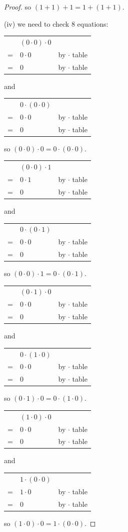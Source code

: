 \documentclass[14pt]{extarticle}
\newcommand{\cy}{\color{cyan}}
\begin{document}
\begin{proof}
so \((1 + 1) + 1 = 1 + (1 + 1)\).

(iv) we need to check 8 equations:

\begin{tabular}{cll}
  & \((0 \cdot 0) \cdot 0\) & \\
= & \(0 \cdot 0\) & {\cy by $\cdot$ table} \\
= & \(0\) & {\cy by $\cdot$ table}
\end{tabular}
and
\begin{tabular}{cll}
  & \(0 \cdot (0 \cdot 0)\) & \\
= & \(0 \cdot 0\) & {\cy by $\cdot$ table} \\
= & \(0\) & {\cy by $\cdot$ table}
\end{tabular}
so \((0 \cdot 0) \cdot 0 = 0 \cdot (0 \cdot 0)\).

\begin{tabular}{cll}
  & \((0 \cdot 0) \cdot 1\) & \\
= & \(0 \cdot 1\) & {\cy by $\cdot$ table} \\
= & \(0\) & {\cy by $\cdot$ table}
\end{tabular}
and
\begin{tabular}{cll}
  & \(0 \cdot (0 \cdot 1)\) & \\
= & \(0 \cdot 0\) & {\cy by $\cdot$ table} \\
= & \(0\) & {\cy by $\cdot$ table}
\end{tabular}
so \((0 \cdot 0) \cdot 1 = 0 \cdot (0 \cdot 1)\).

\begin{tabular}{cll}
  & \((0 \cdot 1) \cdot 0\) & \\
= & \(0 \cdot 0\) & {\cy by $\cdot$ table} \\
= & \(0\) & {\cy by $\cdot$ table}
\end{tabular}
and
\begin{tabular}{cll}
  & \(0 \cdot (1 \cdot 0)\) & \\
= & \(0 \cdot 0\) & {\cy by $\cdot$ table} \\
= & \(0\) & {\cy by $\cdot$ table}
\end{tabular}
so \((0 \cdot 1) \cdot 0 = 0 \cdot (1 \cdot 0)\).

\begin{tabular}{cll}
  & \((1 \cdot 0) \cdot 0\) & \\
= & \(0 \cdot 0\) & {\cy by $\cdot$ table} \\
= & \(0\) & {\cy by $\cdot$ table}
\end{tabular}
and
\begin{tabular}{cll}
  & \(1 \cdot (0 \cdot 0)\) & \\
= & \(1 \cdot 0\) & {\cy by $\cdot$ table} \\
= & \(0\) & {\cy by $\cdot$ table}
\end{tabular}
so \((1 \cdot 0) \cdot 0 = 1 \cdot (0 \cdot 0)\).


\end{proof}
\end{document}

